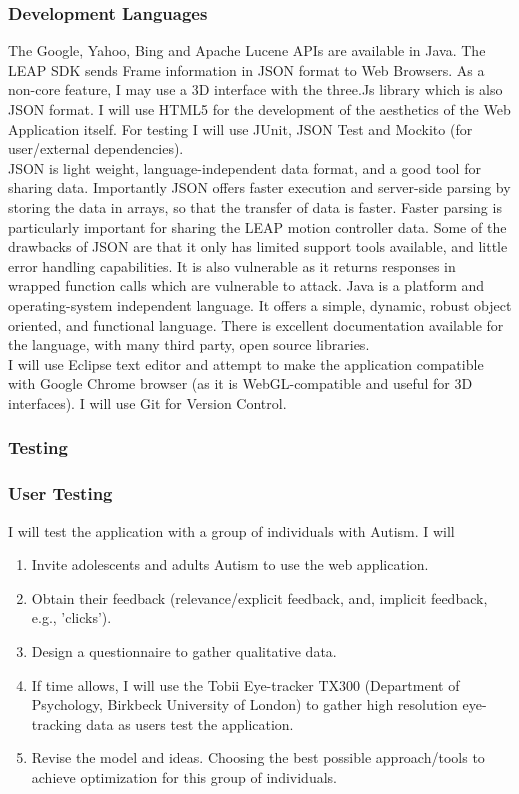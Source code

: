 \documentclass[a4paper, 10pt]{article}
\begin{document}
\subsubsection{Development Languages}
The Google, Yahoo, Bing and Apache Lucene APIs are available in Java. The LEAP SDK sends Frame information in JSON format to Web Browsers. As a non-core feature, I may use a 3D interface with the three.Js library which is also JSON format. I will use HTML5 for the development of the aesthetics of the Web Application itself.
For testing I will use JUnit, JSON Test and Mockito (for user/external dependencies).\\
JSON is light weight, language-independent data format, and a good tool for sharing data. Importantly JSON offers faster execution and server-side parsing by storing the data in arrays, so that the transfer of data is faster. Faster parsing is particularly important for sharing the LEAP motion controller data. Some of the drawbacks of JSON are that it only has limited support tools available, and little error handling capabilities. It is also vulnerable as it returns responses in wrapped function calls which are vulnerable to attack. Java is a platform and operating-system independent language. It offers a simple, dynamic, robust object oriented, and functional language. There is excellent documentation available for the language, with many third party, open source libraries.\\
I will use Eclipse text editor and attempt to make the application compatible with Google Chrome browser (as it is WebGL-compatible and useful for 3D interfaces). I will use Git for Version Control.

\subsubsection{Testing}
\subsubsection{User Testing}
I will test the application with a group of individuals with Autism. I will
\begin{enumerate}
\item Invite adolescents and adults Autism to use the web application.
\item Obtain their feedback (relevance/explicit feedback, and, implicit feedback, e.g., 'clicks'). 
\item Design a questionnaire to gather qualitative data. 
\item If time allows, I will use the Tobii Eye-tracker TX300 (Department of Psychology, Birkbeck University of London) to gather high resolution eye-tracking data as users test the application. 
\item Revise the model and ideas. Choosing the best possible approach/tools to achieve optimization for this group of individuals.
\end{enumerate}
\end{document}
